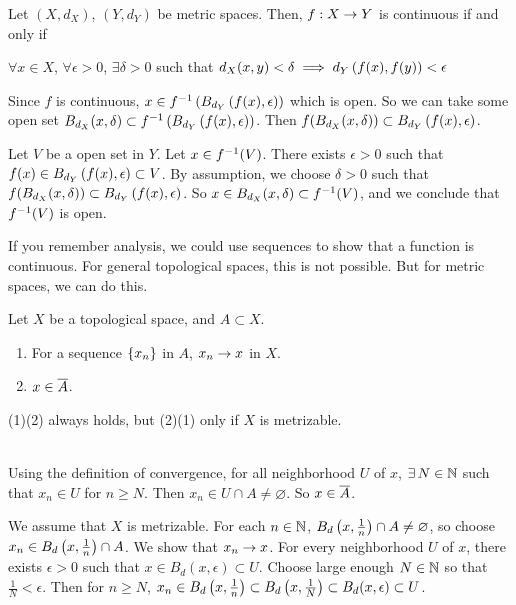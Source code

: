  Let \((X, d_X)\), \((Y, d_Y)\) be metric spaces. Then, \(f : X \rightarrow Y\) is continuous if and only if
\begin{center}
    \(\forall x \in X\), \(\forall \epsilon > 0\), \(\exists \delta > 0\) such that \(d_X(x, y) < \delta \implies d_Y\left( f(x), f(y) \right) < \epsilon\)
\end{center}

\pf
\note{\mimp} Since \(f\) is continuous, \(x \in f^{-1}\left( B_{d_Y}\left( f(x), \epsilon \right) \right)\) which is open. So we can take some open set \(B_{d_X}(x, \delta) \subset f^{-1}\left( B_{d_Y}\left( f(x), \epsilon \right) \right)\). Then \(f(B_{d_X}(x, \delta)) \subset B_{d_Y}\left( f(x), \epsilon \right)\).

\note{\mimpd} Let \(V\) be a open set in \(Y\). Let \(x \in f^{-1}(V)\). There exists \(\epsilon > 0\) such that \(f(x) \in B_{d_Y}\left( f(x), \epsilon \right) \subset V\). By assumption, we choose \(\delta > 0\) such that \(f(B_{d_X}(x, \delta)) \subset B_{d_Y}\left( f(x), \epsilon \right)\). So \(x \in B_{d_X}(x, \delta) \subset f^{-1}(V)\), and we conclude that \(f^{-1}(V)\) is open.

If you remember analysis, we could use sequences to show that a function is continuous. For general topological spaces, this is not possible. But for metric spaces, we can do this.

  Let \(X\) be a topological space, and \(A \subset X\).
\begin{enumerate}
    \item For a sequence \(\left\{ x_n \right\}\) in \(A\), \(x_n \rightarrow x\) in \(X\).
    \item \(x \in \overline{A}\).
\end{enumerate}
(1)\mimp (2) always holds, but (2)\mimp (1) only if \(X\) is metrizable.

\pf \\
\note{\mimp} Using the definition of convergence, for all neighborhood \(U\) of \(x\), \(\exists N \in \N\) such that \(x_n \in U\) for \(n \geq N\). Then \(x_n \in U \cap A \neq \varnothing\). So \(x \in \overline{A}\).

\note{\mimpd} We assume that \(X\) is metrizable. For each \(n \in \mathbb{N}\), \(B_d\left( x, \frac{1}{n} \right) \cap A \neq \varnothing\), so choose \(x_n \in B_d\left( x, \frac{1}{n} \right) \cap A\). We show that \(x_n \rightarrow x\). For every neighborhood \(U\) of \(x\), there exists \(\epsilon > 0\) such that \(x \in B_d(x, \epsilon) \subset U\). Choose large enough \(N \in \mathbb{N}\) so that \(\frac{1}{N} < \epsilon\). Then for \(n \geq N\), \(x_n \in B_d\left( x, \frac{1}{n} \right) \subset B_d\left( x, \frac{1}{N} \right) \subset B_d(x, \epsilon) \subset U\).

